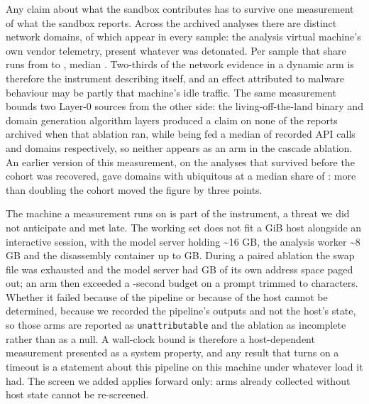 Any claim about what the sandbox contributes has to survive one measurement of what the sandbox
reports. Across the  archived analyses there are
 distinct network domains, of which
 appear in every sample: the analysis virtual machine's own vendor
telemetry, present whatever was detonated. Per sample that share runs from
 to , median
. Two-thirds of the network evidence in a dynamic arm is therefore
the instrument describing itself, and an effect attributed to malware behaviour may be partly that
machine's idle traffic. The same measurement bounds two Layer-0 sources from the other side: the
living-off-the-land binary and domain generation algorithm layers produced a claim on none of the
 reports archived when that ablation ran, while being fed a median of
 recorded API calls and  domains
respectively, so neither appears as an arm in the cascade ablation. An earlier version of this
measurement, on the  analyses that survived before the cohort was
recovered, gave  domains with 
ubiquitous at a median share of : more than doubling the cohort moved
the figure by three points.

The machine a measurement runs on is part of the instrument, a threat we did not anticipate and met
late. The working set does not fit a  GiB host alongside an interactive session,
with the model server holding \textasciitilde16 GB, the analysis worker \textasciitilde8 GB and the
disassembly container up to  GB. During a paired ablation the swap file
was exhausted and the model server had  GB of its own address space paged
out; an arm then exceeded a -second budget on a prompt trimmed to
 characters. Whether it failed because of the pipeline or because of the host
cannot be determined, because we recorded the pipeline's outputs and not the host's state, so those
arms are reported as \texttt{unattributable} and the ablation as incomplete rather than as a null. A
wall-clock bound is therefore a host-dependent measurement presented as a system property, and any
result that turns on a timeout is a statement about this pipeline on this machine under whatever
load it had. The screen we added applies forward only: arms already collected without host state
cannot be re-screened.

